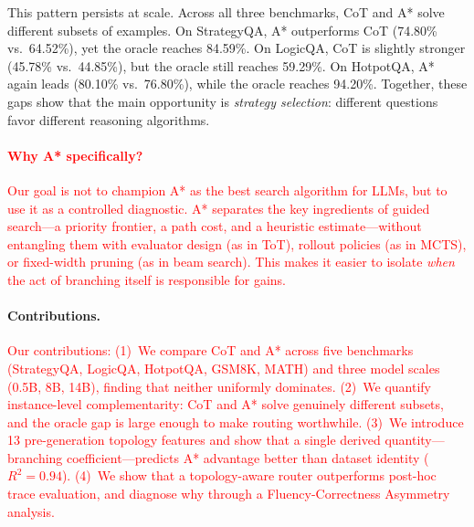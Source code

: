 \documentclass[11pt]{article}
\begin{document}

This pattern persists at scale. Across all three benchmarks, CoT and A* solve different subsets of examples. On StrategyQA, A* outperforms CoT (74.80\% vs.\ 64.52\%), yet the oracle reaches 84.59\%. On LogicQA, CoT is slightly stronger (45.78\% vs.\ 44.85\%), but the oracle still reaches 59.29\%. On HotpotQA, A* again leads (80.10\% vs.\ 76.80\%), while the oracle reaches 94.20\%. Together, these gaps show that the main opportunity is \emph{strategy selection}: different questions favor different reasoning algorithms.

\textcolor{red}{\paragraph{Why A* specifically?}
Our goal is not to champion A* as the best search algorithm for LLMs, but to use it as a controlled diagnostic. A* separates the key ingredients of guided search---a priority frontier, a path cost, and a heuristic estimate---without entangling them with evaluator design (as in ToT), rollout policies (as in MCTS), or fixed-width pruning (as in beam search). This makes it easier to isolate \emph{when} the act of branching itself is responsible for gains.}

\paragraph{Contributions.}
\textcolor{red}{Our contributions: (1)~We compare CoT and A* across five benchmarks (StrategyQA, LogicQA, HotpotQA, GSM8K, MATH) and three model scales (0.5B, 8B, 14B), finding that neither uniformly dominates. (2)~We quantify instance-level complementarity: CoT and A* solve genuinely different subsets, and the oracle gap is large enough to make routing worthwhile. (3)~We introduce 13 pre-generation topology features and show that a single derived quantity---branching coefficient---predicts A* advantage better than dataset identity ($R^2=0.94$). (4)~We show that a topology-aware router outperforms post-hoc trace evaluation, and diagnose why through a Fluency-Correctness Asymmetry analysis.}
\end{document}
